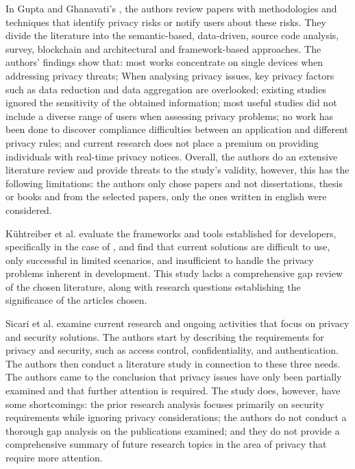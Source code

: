 In Gupta and Ghanavati's \cite{Gupta2022Privacy} \hyperlink{\acronym}{\acronym}, the authors review
papers with methodologies and techniques that identify privacy risks or
notify users about these risks. They divide the literature into the semantic-based,
data-driven, source code analysis, survey, blockchain and architectural
and framework-based approaches. The authors' findings show that: most works concentrate
on single \hyperlink{\acronym}{\acronym} devices when addressing privacy threats; When analysing privacy
issues, key privacy factors such as data reduction and data aggregation
are overlooked; existing studies ignored the sensitivity of the obtained
information; most useful studies did not include a diverse range of users
when assessing privacy problems; no work has been done to discover compliance
difficulties between an \hyperlink{\acronym}{\acronym} application and different privacy rules; and
current research does not place a premium on providing individuals with real-time
privacy notices. Overall, the authors do an extensive literature review
and provide threats to the study's validity, however, this \hyperlink{\acronym}{\acronym} has the
following limitations: the authors only chose papers and not dissertations,
thesis or books and from the selected papers, only the ones written in english
were considered.

Kühtreiber et al. \cite{Kuhtreiber2022survey} evaluate the frameworks and
tools established for developers, specifically in the case of \hyperlink{\acronym}{\acronym}, and find
that current solutions are difficult to use, only successful in limited
scenarios, and insufficient to handle the privacy problems inherent in \hyperlink{\acronym}{\acronym}
development. This study lacks a comprehensive gap review of the chosen
literature, along with research questions establishing the significance
of the articles chosen.

Sicari et al. \cite{sicari2015security} examine current research and ongoing
activities that focus on \hyperlink{\acronym}{\acronym} privacy and security solutions. The authors
start by describing the requirements for \hyperlink{\acronym}{\acronym} privacy and security, such
as access control, confidentiality, and authentication. The authors then
conduct a literature study in connection to these three needs. The authors
came to the conclusion that \hyperlink{\acronym}{\acronym} privacy issues have only been partially
examined and that further attention is required. The study does, however, have
some shortcomings: the prior research analysis focuses primarily on security
requirements while ignoring privacy considerations; the authors do not conduct
a thorough gap analysis on the publications examined; and they do not provide
a comprehensive summary of future research topics in the area of \hyperlink{\acronym}{\acronym} privacy
that require more attention.

